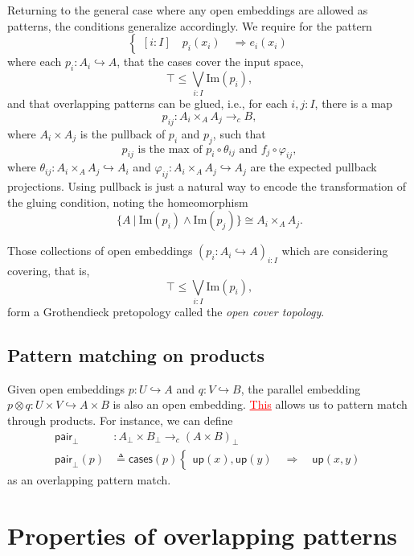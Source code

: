 \documentclass[conference]{IEEEtran}
\newcommand{\hookto}{\hookrightarrow}
\newcommand{\cto}{\to_c}
\newcommand{\suchthat}{\ |\ }
\newcommand{\Img}[1]{\text{Im}\left({#1}\right)}
\newcommand{\Branch}{\Rightarrow}
\newcommand{\up}{\mathsf{up}}
\newcommand{\isthemaxof}[3]{{#1}\text{ is the max of }{#2}\text{ and }{#3}}
\newcommand{\grammar}[1]{\textcolor{red}{\underline{#1}}}
\begin{document}
Returning to the general case where any open embeddings are allowed as patterns, the conditions generalize accordingly. We require for the pattern
\[
\begin{cases}
[i : I] \quad p_i(x_i) \quad \Branch e_i(x_i)
\end{cases}
\]
where each $p_i : A_i \hookto A$, that the cases cover the input space,
\[
\top \le \bigvee_{i : I} \Img{p_i},
\]
and that overlapping patterns can be glued, i.e., for each $i, j : I$, there is a map
\[
p_{ij} : A_i \times_A A_j \cto B,
\]
where $A_i \times A_j$ is the pullback of $p_i$ and $p_j$, such that 
\[
\isthemaxof{ p_{ij} }{ p_i \circ \theta_{ij}}{ f_j \circ \varphi_{ij}},
\]
where $\theta_{ij} : A_i \times_A A_j \hookto A_i$ and $\varphi_{ij} : A_i \times_A A_j \hookto A_j$ are the expected pullback projections. Using pullback is just a natural way to encode the transformation of the gluing condition, noting the homeomorphism
\[
 \{A \suchthat \Img{p_i} \wedge \Img{p_j} \} \cong A_i \times_A A_j.
\]

Those collections of open embeddings $\left( p_i : A_i \hookto A \right)_{i : I}$ which are considering covering, that is,
\[
\top \le \bigvee_{i : I} \Img{p_i},
\]
form a Grothendieck pretopology called the \emph{open cover topology}.

\subsection{Pattern matching on products}

Given open embeddings $p : U \hookto A$ and $q : V \hookto B$, the parallel embedding $p \otimes q : U \times V \hookto A \times B$ is also an open embedding. \grammar{This} allows us to pattern match through products. 
For instance, we can define
\begin{align*}
 \mathsf{pair}_\bot &: A_\bot \times B_\bot \cto \left( A \times B \right)_\bot
\\ \mathsf{pair}_\bot(p) &\triangleq \mathsf{cases}(p)
\begin{cases}
\up(x) , \up(y)
  \quad \Branch \quad \up(x, y)
\end{cases}
\end{align*}
as an overlapping pattern match.

\section{Properties of overlapping patterns}
\label{s:properties}
\end{document}
